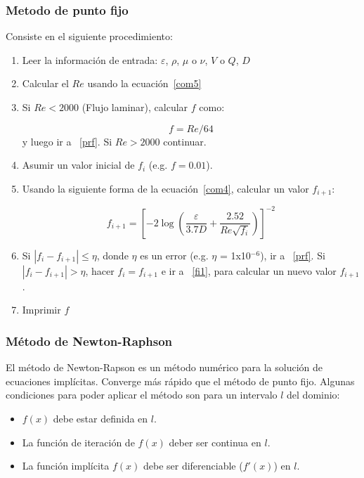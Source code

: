 \documentclass[10pt, oneside]{article}
\begin{document}
\subsubsection{Metodo de punto fijo} \label{sec:pf}
Consiste en el siguiente procedimiento:
\begin{enumerate} 
\item Leer la informaci\'on de entrada: $\varepsilon$, $\rho$, $\mu$ o $\nu$, $V$ o $Q$, $D$ 
\item Calcular el $Re$ usando la ecuaci\'on~\ref{com5}
\item Si $Re<2000$ (Flujo laminar), calcular $f$ como:

\begin{equation}
f=Re/64  
\label{com8}
\end{equation}
y luego ir a ~\ref{prf}. Si $Re > 2000$ continuar.

\item Asumir un valor inicial de $f_i$ (e.g. $f=0.01$).
\item \label{fi1} Usando la siguiente forma de la ecuaci\'on~\ref{com4}, calcular un valor $f_{i+1}$:

\begin{equation}
 f_{i+1} = \left[-2 \log \left( \frac{\varepsilon}{3.7D} + \frac{2.52}{Re \sqrt{f_i}} \right) \right]^{-2}
\label{com8}
\end{equation}

\item Si $|f_{i}- f_{i+1}| \leq \eta$, donde $\eta$ es un error  (e.g. $\eta$ = 1x10$^{-6}$), ir a ~\ref{prf}. Si $|f_{i}- f_{i+1}| > \eta$, hacer $f_i = f_{i+1}$ e ir a ~\ref{fi1},  para  calcular un nuevo valor $f_{i+1}$.
\item \label{prf} Imprimir $f$
\end{enumerate} 

\subsubsection{M\'etodo de Newton-Raphson} \label{sec:nr}
El m\'etodo de Newton-Rapson es un m\'etodo num\'erico para la soluci\'on de ecuaciones impl\'icitas. Converge m\'as r\'apido que el m\'etodo de punto fijo. Algunas condiciones para poder aplicar el m\'etodo son para un intervalo $l$ del dominio:
\begin{itemize}
\item $f(x)$ debe estar definida en $l$.
\item La funci\'on de iteraci\'on de $f(x)$ deber ser continua en $l$.
\item La funci\'on impl\'icita $f(x)$ debe ser diferenciable ($f'(x)$) en $l$.
\end{itemize}
\end{document}

